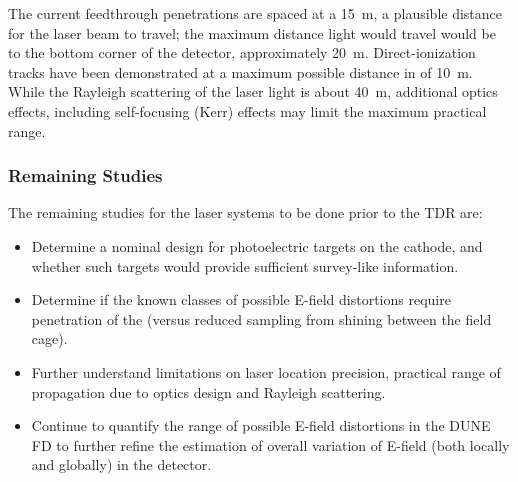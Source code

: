 The current feedthrough penetrations are spaced at a \SI{15}{\m}, a plausible distance for the laser beam to travel; the maximum distance light would travel would be to the bottom corner of the detector, approximately \SI{20}{\m}. Direct-ionization tracks have been demonstrated at a maximum possible distance in \microboone of \SI{10}{\m}. While the Rayleigh scattering of the laser light is about \SI{40}{\m}, additional optics effects, including self-focusing (Kerr) effects may limit the maximum practical range.

\subsubsection{Remaining Studies}

The remaining studies for the laser systems to be done prior to the TDR are:

\begin{itemize}
\item Determine %
a nominal design for photoelectric targets on the cathode, and whether %
such targets would provide sufficient survey-like information.
\item Determine if the known classes of possible E-field distortions require penetration of the  (versus reduced sampling from shining between the field cage). 
\item Further understand limitations on laser location precision, practical range of propagation due to optics design and Rayleigh scattering.
\item Continue to quantify the range of possible E-field distortions in the DUNE FD to further refine the estimation of overall variation of E-field (both locally and globally) in the detector.
\end{itemize}

